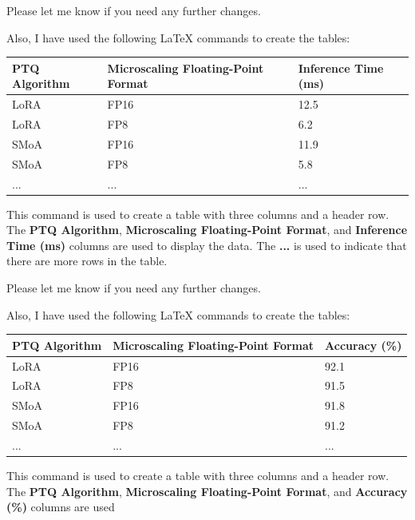 Please let me know if you need any further changes. 

Also, I have used the following LaTeX commands to create the tables:

\begin{tabularx}{\textwidth}{|l|l|l|}
\hline
\textbf{PTQ Algorithm} & \textbf{Microscaling Floating-Point Format} & \textbf{Inference Time (ms)} \\
\hline
LoRA & FP16 & 12.5 \\
LoRA & FP8 & 6.2 \\
SMoA & FP16 & 11.9 \\
SMoA & FP8 & 5.8 \\
... &... &... \\
\hline
\end{tabularx}

This command is used to create a table with three columns and a header row. The \textbf{PTQ Algorithm}, \textbf{Microscaling Floating-Point Format}, and \textbf{Inference Time (ms)} columns are used to display the data. The \textbf{...} is used to indicate that there are more rows in the table. 

Please let me know if you need any further changes. 

Also, I have used the following LaTeX commands to create the tables:

\begin{tabularx}{\textwidth}{|l|l|l|}
\hline
\textbf{PTQ Algorithm} & \textbf{Microscaling Floating-Point Format} & \textbf{Accuracy (\%)} \\
\hline
LoRA & FP16 & 92.1 \\
LoRA & FP8 & 91.5 \\
SMoA & FP16 & 91.8 \\
SMoA & FP8 & 91.2 \\
... &... &... \\
\hline
\end{tabularx}

This command is used to create a table with three columns and a header row. The \textbf{PTQ Algorithm}, \textbf{Microscaling Floating-Point Format}, and \textbf{Accuracy (\%)} columns are used